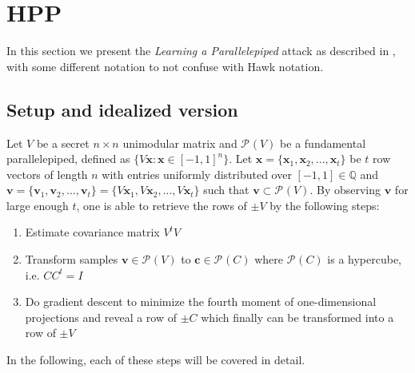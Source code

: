 
\newcommand{\PP}[2][]{\mathcal{P}_{#1}(\mat{#2})}
\newcommand{\mat}[1]{\mathit{#1}}
\renewcommand{\vec}[1]{\mathbf{#1}}
\newcommand{\GLnR}{\mathcal{GL}_{n}(\mathbb{R})}
\newcommand{\normdist}[2]{\mathcal{N}(#1, #2^2)}
\newcommand{\dgdist}{\mathcal{D}_{2\bb{Z}+c, \sigma}}
\newcommand{\bb}[1]{\mathbb{#1}}

\newtheorem{lemma}{Lemma}
\newtheorem{proof}{Proof}

\section{HPP}
In this section we present the \textit{Learning a Parallelepiped} attack as described in \cite{NR09}, with some different notation to not confuse with Hawk notation.
\subsection{Setup and idealized version}
Let $\mat{V}$ be a secret $n \times n$ unimodular matrix and $\PP{V}$ be a fundamental parallelepiped, defined as $\{V \vec{x}: \vec{x} \in [-1, 1]^n\}$. Let $\vec{x} = \{\vec{x}_1, \vec{x}_2, ...,\vec{x}_t\}$
be $t$ row vectors of length $n$ with entries uniformly distributed over $[-1, 1] \in \bb{Q}$ and $\vec{v} = \{\vec{v}_1, \vec{v}_2, ..., \vec{v}_t\} = \{\mat{V} \vec{x}_1, \mat{V} \vec{x}_2, ..., \mat{V} \vec{x}_t\}$ 
such that $\vec{v} \subset \PP{V}$. By observing $\vec{v}$ for large enough $t$, one is able to retrieve the rows of $\pm \mat{V}$ by the following steps:
\begin{enumerate}
    \item Estimate covariance matrix $\mat{V}^t \mat{V}$
    \item Transform samples $\vec{v} \in \PP{V}$ to $\vec{c} \in \PP{C}$ where $\PP{C}$ is a hypercube, i.e. $\mat{C} \mat{C}^t = \mat{I}$
    \item Do gradient descent to minimize the fourth moment of one-dimensional projections and reveal a row of $\pm \mat{C}$ which finally can be transformed into a row of $\pm \mat{V}$
\end{enumerate}
In the following, each of these steps will be covered in detail.
